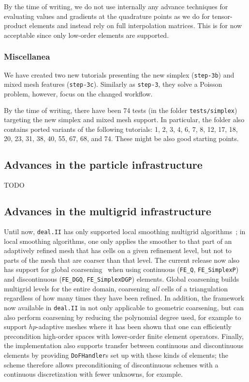\documentclass{ansarticle-preprint}
\newcommand{\specialword}[1]{\texttt{#1}}
\newcommand{\dealii}{{\specialword{deal.II}}\xspace}
\begin{document}
By the time of writing, we do not use internally any advance techniques for evaluating values and
gradients at the quadrature points as we do for tensor-product elements and
instead rely on full interpolation matrices. This is for now acceptable since only low-order elements are
supported.

\subsubsection{Miscellanea}

We have created two new tutorials presenting the new simplex (\texttt{step-3b}) and mixed mesh features
(\texttt{step-3c}). Similarly as \texttt{step-3}, they solve a Poisson problem, however, focus
on the changed workflow.

By the time of writing, there have been 74 tests (in the folder \texttt{tests/simplex})
targeting the new simplex and mixed mesh support. In particular, the folder also
contains ported variants of the following tutorials: 1, 2, 3, 4, 6, 7, 8, 12, 17, 18, 20, 23, 31, 38,
40, 55, 67, 68, and 74. These might be also good starting points.


\subsection{Advances in the particle infrastructure}
\label{subsec:particles}

TODO

\subsection{Advances in the multigrid infrastructure}
\label{subsec:mg}

Until now, \dealii has only supported local smoothing multigrid
algorithms~\citep{ClevengerHeisterKanschatKronbichler2019}; in local
smoothing algorithms, one only applies the smoother to that part of an
adaptively refined mesh that has cells on a given refinement level,
but not to parts of the mesh that are coarser than that level.
The current release now also has support for global coarsening~\citep{becker00} when
using continuous (\texttt{FE\_Q}, \texttt{FE\_SimplexP}) and
discontinuous (\texttt{FE\_DGQ}, \texttt{FE\_SimplexDGP})
elements. Global coarsening builds multigrid levels for the entire
domain, coarsening \textit{all} cells of a triangulation regardless of
how many times they have been refined. In addition, the framework now available in
\dealii{} in not only applicable to geometric coarsening, but can also
perform coarsening by reducing the polynomial degree used, for example
to support $hp$-adaptive meshes where it has been shown that one can
efficiently precondition high-order spaces with lower-order finite
element operators.
Finally, the implementation also supports transfer between continuous
and discontinuous elements by providing \texttt{DoFHandler}s set up
with these kinds of elements; the scheme therefore allows
preconditioning of discontinuous schemes with a continuous
discretization with fewer unknowns, for example.
\end{document}
